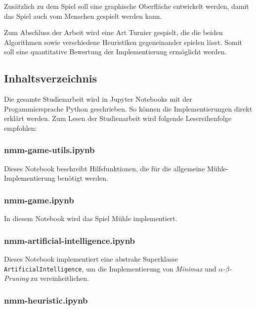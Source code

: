 \documentclass[11pt]{article}
\begin{document}
Zusätzlich zu dem Spiel soll eine graphische Oberfläche entwickelt
werden, damit das Spiel auch vom Menschen gespielt werden kann.

Zum Abschluss der Arbeit wird eine Art Turnier gespielt, die die beiden
Algorithmen sowie verschiedene Heuristiken gegeneinander spielen lässt.
Somit soll eine quantitative Bewertung der Implementierung ermöglicht
werden.

    \hypertarget{inhaltsverzeichnis}{%
\subsection{Inhaltsverzeichnis}\label{inhaltsverzeichnis}}

Die gesamte Studienarbeit wird in Jupyter Notebooks mit der
Progammiersprache Python geschrieben. So können die Implementierungen
direkt erklärt werden. Zum Lesen der Studienarbeit wird folgende
Lesereihenfolge empfohlen:

\hypertarget{nmm-game-utils.ipynb}{%
\subsubsection{nmm-game-utils.ipynb}\label{nmm-game-utils.ipynb}}

Dieses Notebook beschreibt Hilfsfunktionen, die für die allgemeine
Mühle-Implementierung benötigt werden.

\hypertarget{nmm-game.ipynb}{%
\subsubsection{nmm-game.ipynb}\label{nmm-game.ipynb}}

In diesem Notebook wird das Spiel Mühle implementiert.

\hypertarget{nmm-artificial-intelligence.ipynb}{%
\subsubsection{nmm-artificial-intelligence.ipynb}\label{nmm-artificial-intelligence.ipynb}}

Dieses Notebook implementiert eine abstrake Superklasse
\texttt{ArtificialIntelligence}, um die Implementierung von
\emph{Minimax} und \emph{$\alpha$-$\beta$-Pruning} zu vereinheitlichen.

\hypertarget{nmm-heuristic.ipynb}{%
\subsubsection{nmm-heuristic.ipynb}\label{nmm-heuristic.ipynb}}
\end{document}
